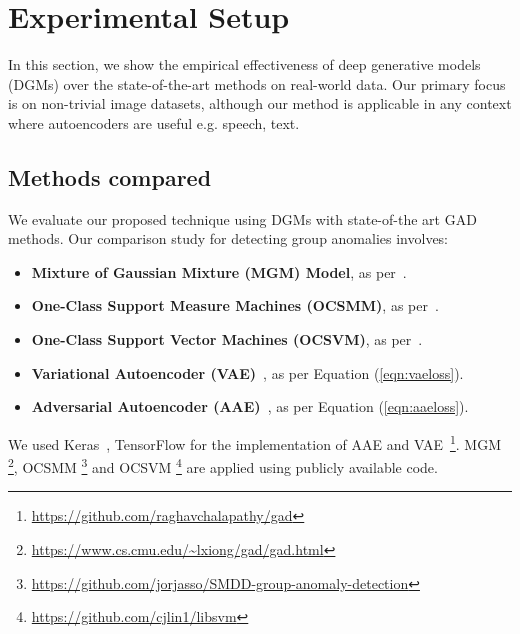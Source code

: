 \section{Experimental Setup}  \label{sec:experiment-setup} 
In this section, we show the empirical effectiveness of deep generative models (DGMs) over the state-of-the-art methods on real-world data. Our primary focus is on non-trivial image datasets, although our method is applicable in any context where autoencoders are useful e.g. speech, text.

\subsection{Methods compared}
 We evaluate our proposed  technique using DGMs with  state-of-the art GAD methods. Our comparison study  for detecting group anomalies involves:
\let\labelitemi\labelitemii
\begin{itemize}

	\item \textbf{Mixture of Gaussian Mixture (MGM)  Model}, as per~\cite{MGM}.
	\item \textbf{One-Class Support Measure Machines (OCSMM)}, as per~\cite{OCSMM}.
	\item \textbf{One-Class Support Vector Machines (OCSVM)}, as per~\cite{OCSVM}.
 	\item \textbf{Variational Autoencoder (VAE)}~\cite{doersch2016tutorial}, as per Equation (\ref{eqn:vaeloss}).
	\item \textbf{Adversarial Autoencoder (AAE)}~\cite{makhzani2015adversarial}, as per Equation (\ref{eqn:aaeloss}).
\end{itemize}

We used Keras~\cite{chollet2015keras}, TensorFlow \cite{abadi2016tensorflow} for the implementation of AAE and  VAE~\footnote{\url{https://github.com/raghavchalapathy/gad}}. MGM \footnote{\url{https://www.cs.cmu.edu/~lxiong/gad/gad.html}}, OCSMM
\footnote{\url{https://github.com/jorjasso/SMDD-group-anomaly-detection}}
and OCSVM 
\footnote{\url{
https://github.com/cjlin1/libsvm}}
are applied using publicly available code. %

